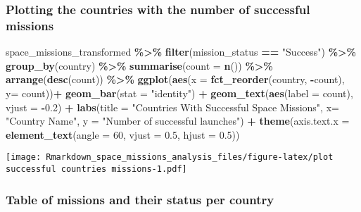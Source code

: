 \documentclass[
]{article}
\newenvironment{Shaded}{\begin{snugshade}}{\end{snugshade}}
\newcommand{\AttributeTok}[1]{\textcolor[rgb]{0.13,0.29,0.53}{#1}}
\newcommand{\DecValTok}[1]{\textcolor[rgb]{0.00,0.00,0.81}{#1}}
\newcommand{\FloatTok}[1]{\textcolor[rgb]{0.00,0.00,0.81}{#1}}
\newcommand{\FunctionTok}[1]{\textcolor[rgb]{0.13,0.29,0.53}{\textbf{#1}}}
\newcommand{\NormalTok}[1]{#1}
\newcommand{\SpecialCharTok}[1]{\textcolor[rgb]{0.81,0.36,0.00}{\textbf{#1}}}
\newcommand{\StringTok}[1]{\textcolor[rgb]{0.31,0.60,0.02}{#1}}
\begin{document}
\hypertarget{plotting-the-countries-with-the-number-of-successful-missions}{%
\subsubsection{Plotting the countries with the number of successful
missions}\label{plotting-the-countries-with-the-number-of-successful-missions}}

\begin{Shaded}
\begin{Highlighting}[]
\NormalTok{space\_missions\_transformed }\SpecialCharTok{\%\textgreater{}\%} 
  \FunctionTok{filter}\NormalTok{(mission\_status }\SpecialCharTok{==} \StringTok{"Success"}\NormalTok{) }\SpecialCharTok{\%\textgreater{}\%} 
  \FunctionTok{group\_by}\NormalTok{(country) }\SpecialCharTok{\%\textgreater{}\%}
  \FunctionTok{summarise}\NormalTok{(}\AttributeTok{count =} \FunctionTok{n}\NormalTok{()) }\SpecialCharTok{\%\textgreater{}\%}
  \FunctionTok{arrange}\NormalTok{(}\FunctionTok{desc}\NormalTok{(count)) }\SpecialCharTok{\%\textgreater{}\%} 
  \FunctionTok{ggplot}\NormalTok{(}\FunctionTok{aes}\NormalTok{(}\AttributeTok{x =} \FunctionTok{fct\_reorder}\NormalTok{(country, }\SpecialCharTok{{-}}\NormalTok{count), }\AttributeTok{y=}\NormalTok{ count))}\SpecialCharTok{+}
  \FunctionTok{geom\_bar}\NormalTok{(}\AttributeTok{stat =} \StringTok{"identity"}\NormalTok{) }\SpecialCharTok{+}
  \FunctionTok{geom\_text}\NormalTok{(}\FunctionTok{aes}\NormalTok{(}\AttributeTok{label =}\NormalTok{ count), }\AttributeTok{vjust =} \SpecialCharTok{{-}}\FloatTok{0.2}\NormalTok{) }\SpecialCharTok{+}
  \FunctionTok{labs}\NormalTok{(}\AttributeTok{title =} \StringTok{"Countries With Successful Space Missions"}\NormalTok{,}
       \AttributeTok{x=} \StringTok{"Country Name"}\NormalTok{,}
       \AttributeTok{y =} \StringTok{"Number of successful launches"}\NormalTok{) }\SpecialCharTok{+}
  \FunctionTok{theme}\NormalTok{(}\AttributeTok{axis.text.x =} \FunctionTok{element\_text}\NormalTok{(}\AttributeTok{angle =} \DecValTok{60}\NormalTok{, }\AttributeTok{vjust =} \FloatTok{0.5}\NormalTok{, }\AttributeTok{hjust =} \FloatTok{0.5}\NormalTok{)) }
\end{Highlighting}
\end{Shaded}

\texttt{[image: Rmarkdown\_space\_missions\_analysis\_files/figure-latex/plot successful countries missions-1.pdf]}

\hypertarget{table-of-missions-and-their-status-per-country}{%
\subsubsection{Table of missions and their status per
country}\label{table-of-missions-and-their-status-per-country}}
\end{document}
